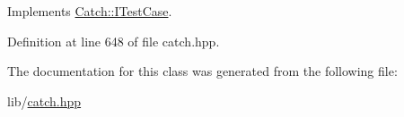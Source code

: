 Implements \hyperlink{struct_catch_1_1_i_test_case_a678825e62e7c17297621cfeb65588c34}{Catch\+::\+I\+Test\+Case}.



Definition at line 648 of file catch.\+hpp.



The documentation for this class was generated from the following file\+:\begin{DoxyCompactItemize}
\item 
lib/\hyperlink{catch_8hpp}{catch.\+hpp}\end{DoxyCompactItemize}
